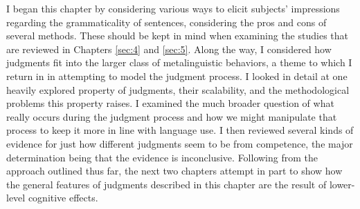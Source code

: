 I began this chapter by considering various ways to elicit subjects' impressions regarding the grammaticality of sentences, considering the pros and cons of several methods. These should be kept in mind when examining the studies that are reviewed in Chapters \ref{sec:4} and \ref{sec:5}. Along the way, I considered how judgments fit into the larger class of metalinguistic behaviors, a theme to which I return in  in attempting to model the judgment process. I looked in detail at one heavily explored property of judgments, their scalability, and the methodological problems this property raises. I examined the much broader question of what really occurs during the judgment process and how we might manipulate that process to keep it more in line with language use. I then reviewed several kinds of evidence for just how different judgments seem to be from competence, the major determination being that the evidence is inconclusive. Following from the approach outlined thus far, the next two chapters attempt in part to show how the general features of judgments described in this chapter are the result of lower-level cognitive effects.

